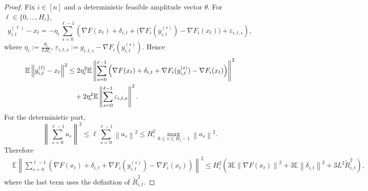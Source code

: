 \documentclass{article}
\theoremstyle{definition}
\newcommand{\EE}{\mathbb E}
\newcommand{\norm}[1]{\left\lVert #1\right\rVert}
\begin{document}
\begin{proof}
Fix $i\in[n]$ and a deterministic feasible amplitude vector $\theta$. For
$\ell\in\{0,\dots,H_i\}$,
\[
y_{i,t}^{(\ell)}-x_t
=
-\eta_i\sum_{s=0}^{\ell-1}
\left(
\nabla F(x_t)+\delta_{i,t}
+\bigl(\nabla F_i(y_{i,t}^{(s)})-\nabla F_i(x_t)\bigr)
+\varepsilon_{i,t,s}
\right),
\]
where $
\eta_i:=\frac{\theta_i}{L H_i}$,
$\varepsilon_{i,t,s}:=g_{i,t,s}-\nabla F_i(y_{i,t}^{(s)})$.
Hence
\begin{align}
\EE\norm{y_{i,t}^{(\ell)}-x_t}^2
&\le
2\eta_i^2
\EE\left\|
\sum_{s=0}^{\ell-1}
\left(
\nabla F(x_t)+\delta_{i,t}
+\nabla F_i(y_{i,t}^{(s)})-\nabla F_i(x_t)
\right)
\right\|^2
\notag\\
&\quad+
2\eta_i^2
\EE\left\|
\sum_{s=0}^{\ell-1}\varepsilon_{i,t,s}
\right\|^2.
\label{eq:sur-radius-split-app-detail}
\end{align}
For the deterministic part,
\[
\left\|\sum_{s=0}^{\ell-1}a_s\right\|^2
\le
\ell\sum_{s=0}^{\ell-1}\norm{a_s}^2
\le
H_i^2\max_{0\le s\le H_i-1}\norm{a_s}^2.
\]
Therefore
\begin{align*}
&\EE\left\|
\sum_{s=0}^{\ell-1}
\left(
\nabla F(x_t)+\delta_{i,t}
+\nabla F_i(y_{i,t}^{(s)})-\nabla F_i(x_t)
\right)
\right\|^2\le
H_i^2\left(
3\EE\norm{\nabla F(x_t)}^2
+
3\EE\norm{\delta_{i,t}}^2
+
3L^2\widetilde R_{i,t}^2
\right),
\end{align*}
where the last term uses the definition of $\widetilde R_{i,t}^2$.


\end{proof}
\end{document}
